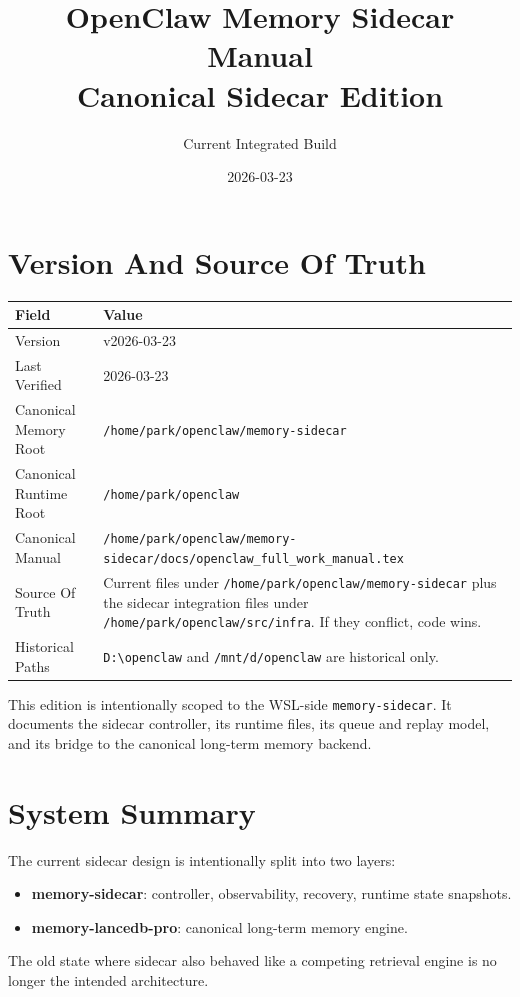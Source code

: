 \documentclass[11pt,a4paper,oneside,openany]{book}
\title{OpenClaw Memory Sidecar Manual\\Canonical Sidecar Edition}
\author{Current Integrated Build}
\date{2026-03-23}
\begin{document}
\frontmatter
\maketitle
\tableofcontents
\chapter*{Version And Source Of Truth}
\begin{longtable}{p{}p{}}
\toprule
\textbf{Field} & \textbf{Value}\\
\midrule
\endhead
Version & v2026-03-23\\
Last Verified & 2026-03-23\\
Canonical Memory Root & \texttt{/home/park/openclaw/memory-sidecar}\\
Canonical Runtime Root & \texttt{/home/park/openclaw}\\
Canonical Manual & \texttt{/home/park/openclaw/memory-sidecar/docs/openclaw\_full\_work\_manual.tex}\\
Source Of Truth & Current files under \texttt{/home/park/openclaw/memory-sidecar} plus the sidecar integration files under \texttt{/home/park/openclaw/src/infra}. If they conflict, code wins.\\
Historical Paths & \texttt{D:\textbackslash openclaw} and \texttt{/mnt/d/openclaw} are historical only.\\
\bottomrule
\end{longtable}
This edition is intentionally scoped to the WSL-side \texttt{memory-sidecar}. It documents the sidecar controller, its runtime files, its queue and replay model, and its bridge to the canonical long-term memory backend.
\mainmatter
\chapter{System Summary}
The current sidecar design is intentionally split into two layers:
\begin{itemize}
  \item \textbf{memory-sidecar}: controller, observability, recovery, runtime state snapshots.
  \item \textbf{memory-lancedb-pro}: canonical long-term memory engine.
\end{itemize}
The old state where sidecar also behaved like a competing retrieval engine is no longer the intended architecture.
\end{document}
